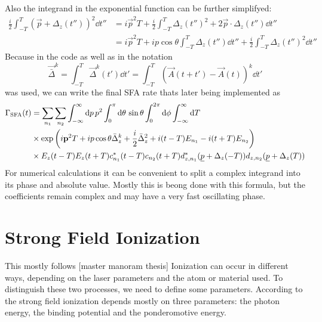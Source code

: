 Also the integrand in the exponential function can be further simplifyed:
\begin{align*}
    \frac{i}{2}\int_{-T}^{T}(\vec{p}+\Delta_z(t''))^2\dd t'' &= i\vec{p}^2T + \frac{i}{2}\int_{-T}^{T}\Delta_z(t'')^2+2\vec{p}\cdot\Delta_z(t'')\dd t'' \\
    &= i\vec{p}^2T + ip\cos\theta\int_{-T}^{T}\Delta_z(t'')\dd t'' +  \frac{i}{2}\int_{-T}^{T}\Delta_z(t'')^2\dd t''
\end{align*}
Because in the code as well as in \cite{Theory_NPS} the notation
\begin{equation*}
    \vec{\bar{\Delta}}^k = \int_{-T}^{T}\vec{\Delta}^k(t')\dd t' = \int_{-T}^{T}\left(\vec{A}(t+t') - \vec{A}(t)\right)^k\dd t'
\end{equation*}
was used, we can write the final SFA rate thats later being implemented as
\begin{align*}
    \Gamma_{\mathrm{SFA}}(t) &= \sum_{n_1}\sum_{n_2} \int_{-\infty}^{\infty} \mathrm{d} p\,p^2\int_0^{\pi} \mathrm{d}\theta\,\sin\theta \int_0^{2\pi}\mathrm{d} \phi\int_{-\infty}^{\infty} \mathrm{d} T\\
    &\times \exp\left(i\mathbf{p}^2T + ip\cos\theta\bar{\Delta}_z^k +  \frac{i}{2}\bar{\Delta}_z^2  + i(t-T)E_{n_1}-i(t+T)E_{n_2}\right)\\
    &\times E_z(t-T) E_z(t+T)c_{n_1}^*(t-T)c_{n_2}(t+T) d_{z,n_1}^*(\underline{p}+\Delta_z(-T))d_{z,n_2}(\underline{p}+\Delta_z(T))
\end{align*}
For numerical calculations it can be convenient to split a complex integrand into its phase and absolute value. 
Mostly this is beong done with this formula, but the coefficients remain complex and may have a very fast oscillating phase.









\newpage
\section{Strong Field Ionization}
This mostly follows [master manoram thesis]
Ionization can occur in different ways, depending on the laser parameters and the atom or material used. 
To distinguish these two processes, we need to define some parameters. 
According to \cite{Keldysh:1965ojf} the strong field ionization depends mostly on three parameters: the photon energy, the binding potential and the ponderomotive energy.


